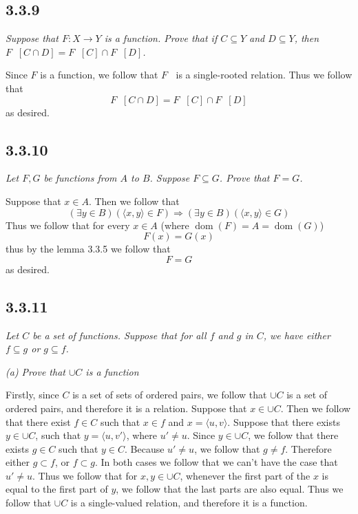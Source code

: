 \documentclass[11pt,oneside,titlepage]{book}
\DeclareMathOperator \inv {^{-1}}
\DeclareMathOperator \ra {\Rightarrow}
\DeclareMathOperator \dom {dom}
\newcommand{\eangle}[1]{\langle #1 \rangle}
\begin{document}
\subsection*{3.3.9}

\textit{Suppose that $F: X \to Y$ is a function. Prove that if $C \subseteq Y$ and
  $D \subseteq Y$, then $F\inv[C \cap D] = F\inv[C] \cap F\inv[D]$.}

Since $F$ is a function, we follow that $F\inv$ is a single-rooted relation. Thus we follow that
$$F\inv[C \cap D] = F\inv[C] \cap F\inv[D]$$
as desired.

\subsection*{3.3.10}

\textit{Let $F, G$ be functions from $A$ to $B$. Suppose $F \subseteq G$. Prove that $F = G$.}

Suppose that $x \in A$. Then we follow that
$$(\exists y \in B)(\eangle{x, y} \in F) \ra (\exists y \in B)(\eangle{x, y} \in G)$$
Thus we follow that for every $x \in A$ (where $\dom (F) = A = \dom(G)$)
$$F(x) = G(x)$$
thus by the lemma 3.3.5 we follow that
$$F = G$$
as desired.


\subsection*{3.3.11}

\textit{Let $C$ be a set of functions. Suppose that for all $f$ and $g$ in $C$, we have either
  $f \subseteq g$ or $g \subseteq f$. }

\textit{(a) Prove that $\cup C$ is a function}

Firstly, since $C$ is a set of sets of ordered pairs, we follow that $\cup C$ is a set of
ordered pairs, and therefore it is a relation. Suppose that $x \in \cup C$. Then we follow that
there exist  $f \in C$ such that $x \in f$ and 
$x = \eangle{u, v}$. Suppose that there exists $y \in \cup C$, such that $y = \eangle{u, v'}$,
where $u' \neq u$. Since $y \in \cup C$, we follow that there exists $g \in C$ such that
$y \in C$. Because $u' \neq u$, we follow that $g \neq f$. Therefore either $g \subset f$,
or $f \subset g$. In both cases we follow that we can't have the case that $u' \neq u$. Thus
we follow that for $x, y \in \cup C$, whenever the first part of the $x$ is equal to the first
part of $y$, we follow that the last parts are also equal. Thus we follow that $\cup C$ is
a single-valued relation, and therefore it is a function.
\end{document}
